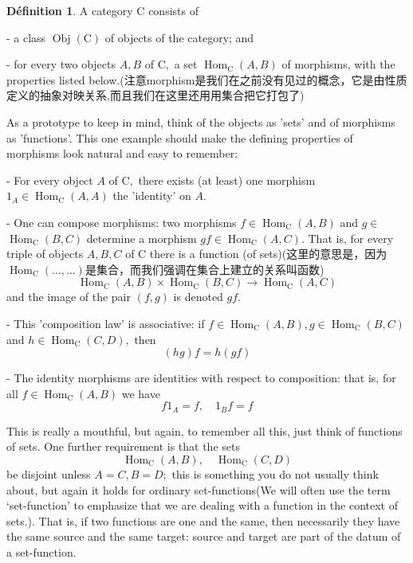 \documentclass[12pt]{book}
\theoremstyle{definition}\newtheorem{dfn}{Définition}[chapter]
\theoremstyle{plain}\newtheorem{thm}{Théorème}[chapter]
\theoremstyle{plain}\newtheorem{prp}{Proposition}[chapter]
\theoremstyle{plain}\newtheorem{lem}{\bf Lemme}[chapter]
\theoremstyle{plain}\newtheorem{axm}{\bf Axiome}[chapter]
\theoremstyle{plain}\newtheorem{lmm}{\bf Lemme}[chapter]
\theoremstyle{plain}\newtheorem{exm}{\bf Example}[chapter]
\theoremstyle{plain}\newtheorem{cor}{\bf Corollaire}[chapter]
\theoremstyle{remark}\newtheorem{rem}{Remarque}[chapter]
\begin{document}
\begin{dfn}
A category $\mathrm{C}$ consists of

- a class $\operatorname{Obj}(\mathrm{C})$ of objects of the category; and

- for every two objects $A, B$ of $\mathrm{C},$ a set $\operatorname{Hom}_{\mathrm{C}}(A, B)$ of morphisms, with the properties listed below.(注意morphism是我们在之前没有见过的概念，它是由性质定义的抽象对映关系,而且我们在这里还用用集合把它打包了)

As a prototype to keep in mind, think of the objects as 'sets' and of morphisms as 'functions'. This one example should make the defining properties of morphisms look natural and easy to remember:

- For every object $A$ of $\mathrm{C},$ there exists (at least) one morphism $1_{A} \in \operatorname{Hom}_{\mathrm{C}}(A, A)$ the 'identity' on $A$.

- One can compose morphisms: two morphisms $f \in \operatorname{Hom}_{\mathrm{C}}(A, B)$ and $g \in$ $\operatorname{Hom}_{\mathrm{C}}(B, C)$ determine a morphism $g f \in \operatorname{Hom}_{\mathrm{C}}(A, C) .$ That is, for every
triple of objects $A, B, C$ of $\mathrm{C}$ there is a function (of sets)(这里的意思是，因为$\operatorname{Hom}_{\mathrm{C}}(...,...)$是集合，而我们强调在集合上建立的关系叫函数)
$$
\operatorname{Hom}_{\mathrm{C}}(A, B) \times \operatorname{Hom}_{\mathrm{C}}(B, C) \rightarrow \operatorname{Hom}_{\mathrm{C}}(A, C)
$$
and the image of the pair $(f, g)$ is denoted $g f$.

- This 'composition law' is associative: if $f \in \operatorname{Hom}_{\mathrm{C}}(A, B), g \in \operatorname{Hom}_{\mathrm{C}}(B, C)$
and $h \in \operatorname{Hom}_{\mathrm{C}}(C, D),$ then
$$
(h g) f=h(g f)
$$

- The identity morphisms are identities with respect to composition: that is, for all $f \in \operatorname{Hom}_{\mathrm{C}}(A, B)$ we have
$$
f 1_{A}=f, \quad 1_{B} f=f
$$
\end{dfn} 
This is really a mouthful, but again, to remember all this, just think of functions of sets. One further requirement is that the sets
$$
\operatorname{Hom}_{\mathrm{C}}(A, B), \quad \operatorname{Hom}_{\mathrm{C}}(C, D)
$$
be disjoint unless $A=C, B=D ;$ this is something you do not usually think about, but again it holds for ordinary set-functions(We will often use the term ‘set-function’ to emphasize that we are dealing with a function in
the context of sets.). That is, if two functions are one and the same, then necessarily they have the same source and the same target: source and target are part of the datum of a set-function.
\end{document}
